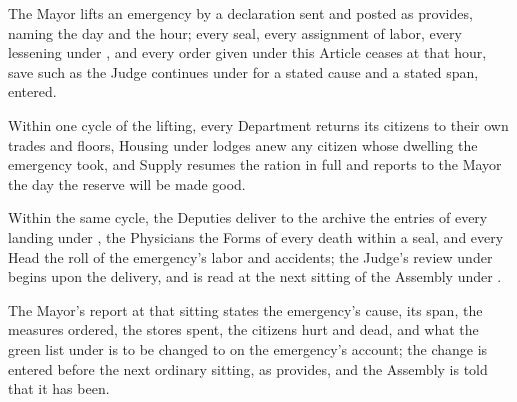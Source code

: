 \begin{clauses}
\item The Mayor lifts an emergency by a declaration sent and posted as  provides, naming the day and the hour; every seal, every assignment of labor, every lessening under , and every order given under this Article ceases at that hour, save such as the Judge continues under  for a stated cause and a stated span, entered.
\item Within one cycle of the lifting, every Department returns its citizens to their own trades and floors, Housing under  lodges anew any citizen whose dwelling the emergency took, and Supply resumes the ration in full and reports to the Mayor the day the reserve will be made good.
\item Within the same cycle, the Deputies deliver to the archive the entries of every landing under , the Physicians the Forms of every death within a seal, and every Head the roll of the emergency's labor and accidents; the Judge's review under  begins upon the delivery, and is read at the next sitting of the Assembly under .
\item The Mayor's report at that sitting states the emergency's cause, its span, the measures ordered, the stores spent, the citizens hurt and dead, and what the green list under  is to be changed to on the emergency's account; the change is entered before the next ordinary sitting, as  provides, and the Assembly is told that it has been.
\end{clauses}
